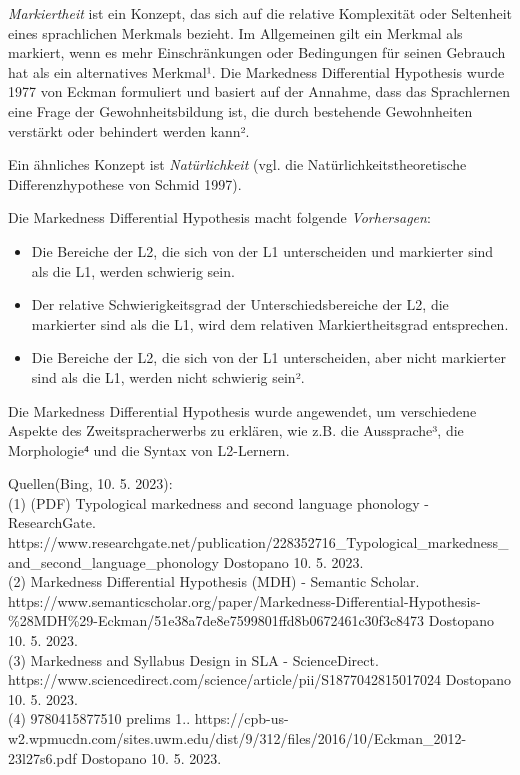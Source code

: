 \documentclass[
  letterpaper,
]{scrbook}
\providecommand{\tightlist}{%
  \setlength{\itemsep}{0pt}\setlength{\parskip}{0pt}}\usepackage{longtable,booktabs,array}
\begin{document}
\emph{Markiertheit} ist ein Konzept, das sich auf die relative
Komplexität oder Seltenheit eines sprachlichen Merkmals bezieht. Im
Allgemeinen gilt ein Merkmal als markiert, wenn es mehr Einschränkungen
oder Bedingungen für seinen Gebrauch hat als ein alternatives Merkmal¹.
Die Markedness Differential Hypothesis wurde 1977 von Eckman formuliert
und basiert auf der Annahme, dass das Sprachlernen eine Frage der
Gewohnheitsbildung ist, die durch bestehende Gewohnheiten verstärkt oder
behindert werden kann².

Ein ähnliches Konzept ist \emph{Natürlichkeit} (vgl. die
Natürlichkeitstheoretische Differenzhypothese von Schmid 1997).

Die Markedness Differential Hypothesis macht folgende
\emph{Vorhersagen}:

\begin{itemize}
\tightlist
\item
  Die Bereiche der L2, die sich von der L1 unterscheiden und markierter
  sind als die L1, werden schwierig sein.\\
\item
  Der relative Schwierigkeitsgrad der Unterschiedsbereiche der L2, die
  markierter sind als die L1, wird dem relativen Markiertheitsgrad
  entsprechen.\\
\item
  Die Bereiche der L2, die sich von der L1 unterscheiden, aber nicht
  markierter sind als die L1, werden nicht schwierig sein².
\end{itemize}

Die Markedness Differential Hypothesis wurde angewendet, um verschiedene
Aspekte des Zweitspracherwerbs zu erklären, wie z.B. die Aussprache³,
die Morphologie⁴ und die Syntax von L2-Lernern.

Quellen(Bing, 10. 5. 2023):\\
(1) (PDF) Typological markedness and second language phonology -
ResearchGate.
https://www.researchgate.net/publication/228352716\_Typological\_markedness\_and\_second\_language\_phonology
Dostopano 10. 5. 2023.\\
(2) Markedness Differential Hypothesis (MDH) - Semantic Scholar.
https://www.semanticscholar.org/paper/Markedness-Differential-Hypothesis-\%28MDH\%29-Eckman/51e38a7de8e7599801ffd8b0672461c30f3c8473
Dostopano 10. 5. 2023.\\
(3) Markedness and Syllabus Design in SLA - ScienceDirect.
https://www.sciencedirect.com/science/article/pii/S1877042815017024
Dostopano 10. 5. 2023.\\
(4) 9780415877510 prelims 1..
https://cpb-us-w2.wpmucdn.com/sites.uwm.edu/dist/9/312/files/2016/10/Eckman\_2012-23l27s6.pdf
Dostopano 10. 5. 2023.
\end{document}
